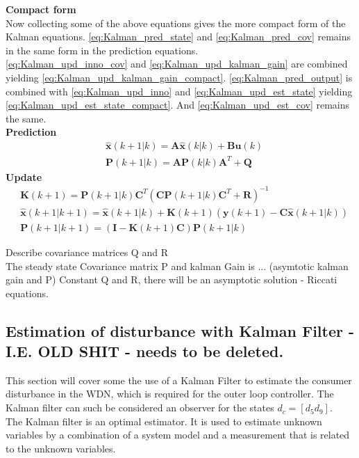 \textbf{Compact form}\\
Now collecting some of the above equations gives the more compact form of the Kalman equations.
\cref{eq:Kalman_pred_state} and \cref{eq:Kalman_pred_cov} remains in the same form in the prediction equations.\\
\cref{eq:Kalman_upd_inno_cov} and \cref{eq:Kalman_upd_kalman_gain} are combined yielding \cref{eq:Kalman_upd_kalman_gain_compact}.
\cref{eq:Kalman_pred_output} is combined with \cref{eq:Kalman_upd_inno} and \cref{eq:Kalman_upd_est_state} yielding \cref{eq:Kalman_upd_est_state_compact}. And \cref{eq:Kalman_upd_est_cov} remains the same.\\
\textbf{Prediction}
\begin{align}
	&\hat{\textbf{x}}(k+1|k) = \textbf{A} \hat{\textbf{x}}(k|k) + \textbf{B}\textbf{u}(k)  		\label{eq:Kalman_pred_state_compact} 	\\
	&\textbf{P}(k+1|k) = \textbf{A}\textbf{P}(k|k)\textbf{A}^T+\textbf{Q} 						\label{eq:Kalman_pred_cov_compact} 		
\end{align}
\textbf{Update}
\begin{align}
	&\textbf{K}(k+1) = \textbf{P}(k+1|k)\textbf{C}^T(\textbf{C}\textbf{P}(k+1|k)\textbf{C}^T + \textbf{R})^{-1}					\label{eq:Kalman_upd_kalman_gain_compact} \\
	&\hat{\textbf{x}}(k+1|k+1) = \hat{\textbf{x}}(k+1|k) + \textbf{K}(k+1)(\textbf{y}(k+1) - \textbf{C}\hat{\textbf{x}}(k+1|k)) \label{eq:Kalman_upd_est_state_compact} \\
	&\textbf{P}(k+1|k+1) = (\textbf{I} - \textbf{K}(k+1)\textbf{C})\textbf{P}(k+1|k)											\label{eq:Kalman_upd_est_cov_compact}
\end{align}


Describe covariance matrices Q and R\\


The steady state Covariance matrix P and kalman Gain is ... (asymtotic kalman gain and P)
Constant Q and R, there will be an asymptotic solution - Riccati equations. 




\clearpage \newpage
\subsection{Estimation of disturbance with Kalman Filter - I.E. OLD SHIT - needs to be deleted.}
This section will cover some the use of a Kalman Filter to estimate the consumer disturbance in the WDN, which is required for the outer loop controller. The Kalman filter can such be considered an observer for the states $d_c = [d_5 d_9]$. \\
The Kalman filter is an optimal estimator. It is used to estimate unknown variables by a combination of a system model and a measurement that is related to the unknown variables. 


